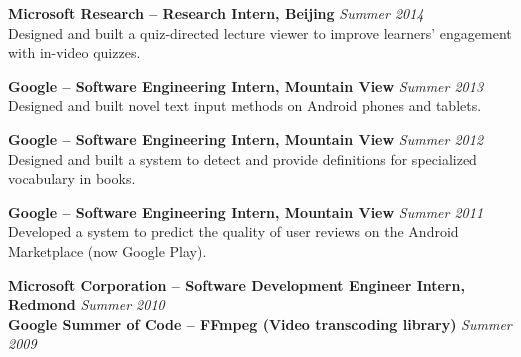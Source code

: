 \documentclass[margin,line]{resume}
\begin{document}
\begin{resume}
\textbf{Microsoft Research -- Research Intern, Beijing} \hfill \textsl{Summer 2014}\\
Designed and built a quiz-directed lecture viewer to improve learners' engagement with in-video quizzes.

\textbf{Google -- Software Engineering Intern, Mountain View} \hfill \textsl{Summer 2013}\\
Designed and built novel text input methods on Android phones and tablets.

\textbf{Google -- Software Engineering Intern, Mountain View} \hfill \textsl{Summer 2012}\\
Designed and built a system to detect and provide definitions for specialized vocabulary in books. %

\textbf{Google -- Software Engineering Intern, Mountain View} \hfill \textsl{Summer 2011}\\
Developed a system to predict the quality of user reviews on the Android Marketplace (now Google Play). %

\textbf{Microsoft Corporation -- Software Development Engineer Intern, Redmond} \hfill \textsl{Summer 2010}\\
\textbf{Google Summer of Code -- FFmpeg (Video transcoding library)} \hfill \textsl{Summer 2009}\\



\end{resume}
\end{document}
